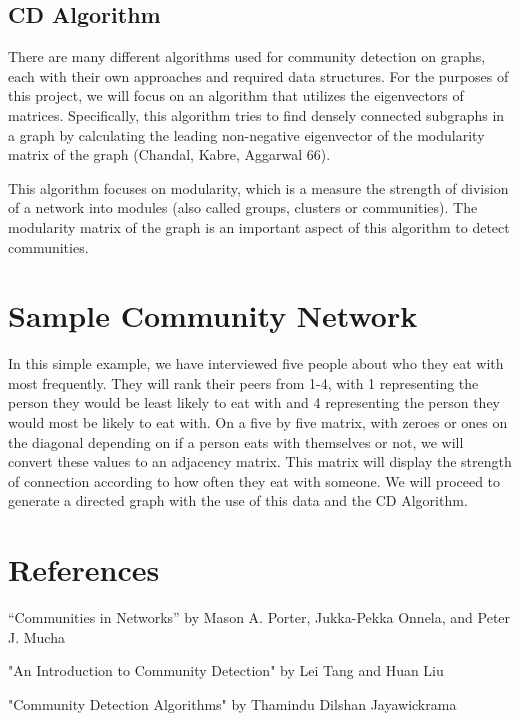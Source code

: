 \documentclass{article}
\begin{document}
\subsection{CD Algorithm}
There are many different algorithms used for community detection on graphs, each with their own approaches and required data structures. 
For the purposes of this project, we will focus on an algorithm that utilizes the eigenvectors of matrices. 
Specifically, this algorithm tries to find densely connected subgraphs in a graph by calculating the leading non-negative eigenvector of the modularity matrix of the graph (Chandal, Kabre, Aggarwal 66). 

\bigskip 

\noindent This algorithm focuses on modularity, which is a measure the strength of division of a network into modules (also called groups, clusters or communities). The modularity matrix of the graph is an important aspect of this algorithm to detect communities. 


\section{Sample Community Network}
In this simple example, we have interviewed five people about who they eat with most frequently. 
They will rank their peers from 1-4, with 1 representing the person they would be least likely to eat with and 4 representing the person they would most be likely to eat with. 
On a five by five matrix, with zeroes or ones on the diagonal depending on if a person eats with themselves or not, we will convert these values to an adjacency matrix.
This matrix will display the strength of connection according to how often they eat with someone.
We will proceed to generate a directed graph with the use of this data and the CD Algorithm.

\pagebreak
\section*{References}

\bigskip

\noindent “Communities in Networks” by Mason A. Porter, Jukka-Pekka Onnela, and Peter J. Mucha

\bigskip 

\noindent "An Introduction to Community Detection" by Lei Tang and Huan Liu

\bigskip 

\noindent "Community Detection Algorithms" by Thamindu Dilshan Jayawickrama
\end{document}
